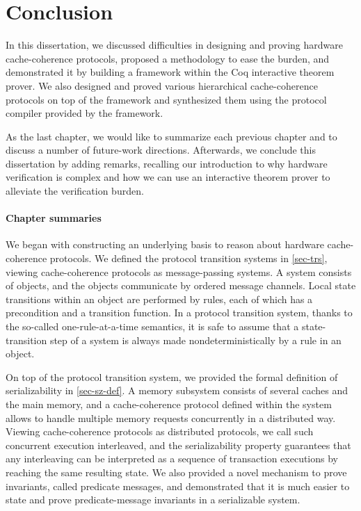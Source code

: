 \chapter*{Conclusion}

In this dissertation, we discussed difficulties in designing and proving hardware cache-coherence protocols, proposed a methodology to ease the burden, and demonstrated it by building a framework \hemiola{} within the Coq interactive theorem prover.
We also designed and proved various hierarchical cache-coherence protocols on top of the framework and synthesized them using the protocol compiler provided by the framework.

As the last chapter, we would like to summarize each previous chapter and to discuss a number of future-work directions.
Afterwards, we conclude this dissertation by adding remarks, recalling our introduction to why hardware verification is complex and how we can use an interactive theorem prover to alleviate the verification burden.

\subsubsection{Chapter summaries}

We began with constructing an underlying basis to reason about hardware cache-coherence protocols.
We defined the protocol transition systems in \autoref{sec-trs}, viewing cache-coherence protocols as message-passing systems.
A system consists of objects, and the objects communicate by ordered message channels.
Local state transitions within an object are performed by rules, each of which has a precondition and a transition function.
In a protocol transition system, thanks to the so-called one-rule-at-a-time semantics, it is safe to assume that a state-transition step of a system is always made nondeterministically by a rule in an object.

On top of the protocol transition system, we provided the formal definition of serializability in \autoref{sec-sz-def}.
A memory subsystem consists of several caches and the main memory, and a cache-coherence protocol defined within the system allows to handle multiple memory requests concurrently in a distributed way.
Viewing cache-coherence protocols as distributed protocols, we call such concurrent execution interleaved, and the serializability property guarantees that any interleaving can be interpreted as a sequence of transaction executions by reaching the same resulting state.
We also provided a novel mechanism to prove invariants, called predicate messages, and demonstrated that it is much easier to state and prove predicate-message invariants in a serializable system.

